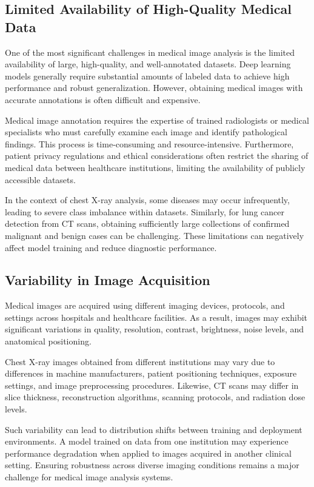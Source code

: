 \subsection{Limited Availability of High-Quality Medical Data}

One of the most significant challenges in medical image analysis is the limited availability of large, high-quality, and well-annotated datasets. Deep learning models generally require substantial amounts of labeled data to achieve high performance and robust generalization. However, obtaining medical images with accurate annotations is often difficult and expensive.

Medical image annotation requires the expertise of trained radiologists or medical specialists who must carefully examine each image and identify pathological findings. This process is time-consuming and resource-intensive. Furthermore, patient privacy regulations and ethical considerations often restrict the sharing of medical data between healthcare institutions, limiting the availability of publicly accessible datasets.

In the context of chest X-ray analysis, some diseases may occur infrequently, leading to severe class imbalance within datasets. Similarly, for lung cancer detection from CT scans, obtaining sufficiently large collections of confirmed malignant and benign cases can be challenging. These limitations can negatively affect model training and reduce diagnostic performance.

\subsection{Variability in Image Acquisition}

Medical images are acquired using different imaging devices, protocols, and settings across hospitals and healthcare facilities. As a result, images may exhibit significant variations in quality, resolution, contrast, brightness, noise levels, and anatomical positioning.

Chest X-ray images obtained from different institutions may vary due to differences in machine manufacturers, patient positioning techniques, exposure settings, and image preprocessing procedures. Likewise, CT scans may differ in slice thickness, reconstruction algorithms, scanning protocols, and radiation dose levels.

Such variability can lead to distribution shifts between training and deployment environments. A model trained on data from one institution may experience performance degradation when applied to images acquired in another clinical setting. Ensuring robustness across diverse imaging conditions remains a major challenge for medical image analysis systems.

